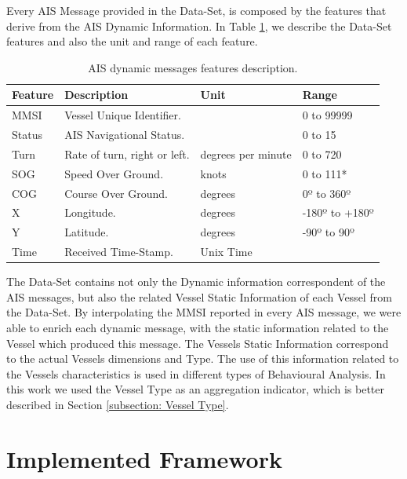 Every AIS Message provided in the Data-Set, is composed by the features that derive from the AIS Dynamic Information. In Table \ref{Table: Data-Set Features}, we describe the Data-Set features and also the unit and range of each feature. 

\begin{table}[H]
\centering
\caption{AIS dynamic messages features description.}
\label{Table: Data-Set Features}
\begin{tabular}{@{}llll@{}}
\toprule
Feature & Description                  & Unit               & Range          \\ \midrule
MMSI    & Vessel Unique Identifier.     &                    & 0 to 99999     \\
Status  & AIS Navigational Status.     &                    & 0 to 15        \\
Turn    & Rate of turn, right or left. & degrees per minute & 0 to 720       \\
SOG     & Speed Over Ground.           & knots              & 0 to 111*      \\
COG     & Course Over Ground.          & degrees            & 0º to 360º     \\
X       & Longitude.                   & degrees            & -180º to +180º \\
Y       & Latitude.                    & degrees            & -90º to 90º    \\
Time    & Received Time-Stamp.         & Unix Time          &                \\ \bottomrule
\end{tabular}
\end{table}

The Data-Set contains not only the Dynamic information correspondent of the AIS messages, but also the related Vessel Static Information of each Vessel from the Data-Set. By interpolating the MMSI reported in every AIS message, we were able to enrich each dynamic message, with the static information related to the Vessel which produced this message. The Vessels Static Information correspond to the actual Vessels dimensions and Type. The use of this information related to the Vessels characteristics is used in different types of Behavioural Analysis. In this work we used the Vessel Type as an aggregation indicator, which is better described in Section \ref{subsection: Vessel Type}.

\section{Implemented Framework}

